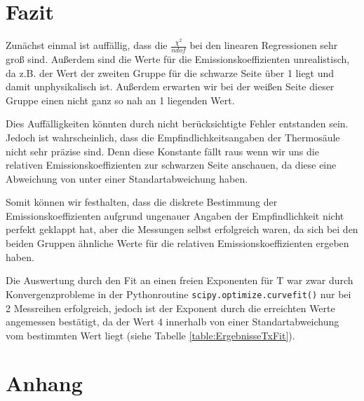 \documentclass[a4paper, 11pt]{article}
\begin{document}
\newpage
\section{Fazit}

Zunächst einmal ist auffällig, dass die $\frac{\chi^2}{ndof}$ bei den linearen Regressionen sehr groß sind. Außerdem sind die Werte für die Emissionskoeffizienten unrealistisch, da z.B. der Wert der zweiten Gruppe für die schwarze Seite über 1 liegt und damit unphysikalisch ist. Außerdem erwarten wir bei der weißen Seite dieser Gruppe einen nicht ganz so nah an 1 liegenden Wert.

Dies Auffälligkeiten könnten durch nicht berücksichtigte Fehler entstanden sein. Jedoch ist wahrscheinlich, dass die Empfindlichkeitsangaben der Thermosäule nicht sehr präzise sind. Denn diese Konstante fällt raus wenn wir uns die relativen Emissionskoeffizienten zur schwarzen Seite anschauen, da diese eine Abweichung von unter einer Standartabweichung haben.

Somit können wir festhalten, dass die diskrete Bestimmung der Emissionskoeffizienten aufgrund ungenauer Angaben der Empfindlichkeit nicht perfekt geklappt hat, aber die Messungen selbst erfolgreich waren, da sich bei den beiden Gruppen ähnliche Werte für die relativen Emissionskoeffizienten ergeben haben.

Die Auswertung durch den Fit an einen freien Exponenten für T war zwar durch Konvergenzprobleme in der Pythonroutine \texttt{scipy.optimize.curvefit()}  nur bei 2 Messreihen erfolgreich, jedoch ist der Exponent durch die erreichten Werte angemessen bestätigt, da der Wert 4 innerhalb von einer Standartabweichung vom bestimmten Wert liegt (siehe Tabelle \ref{table:ErgebnisseTxFit}).

\newpage
\section{Anhang}
\end{document}
